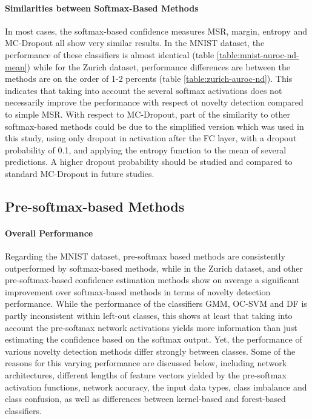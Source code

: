 \documentclass[10pt]{article}
\begin{document}
\paragraph{Similarities between Softmax-Based Methods }  In most cases, the softmax-based confidence measures \gls{MSR}, margin, entropy and \gls{MC-Dropout} all show very similar results. In the MNIST dataset, the performance of these classifiers is almost identical (table \ref{table:mnist-auroc-nd-mean}) while for the Zurich dataset, performance differences are between the methods are on the order of 1-2 percents (table \ref{table:zurich-auroc-nd}). This indicates that taking into account the several softmax activations does not necessarily improve the performance with respect ot novelty detection compared to simple \gls{MSR}. With respect to \gls{MC-Dropout}, part of the similarity to other softmax-based methods could be due to the simplified version which was used in this study, using only dropout in activation after the \gls{FC} layer, with a dropout probability of 0.1, and applying the entropy function to the mean of several predictions. A higher dropout probability should be studied and compared to standard \gls{MC-Dropout} in future studies. 

\subsection{Pre-softmax-based Methods}
\paragraph{Overall Performance}  Regarding the \gls{MNIST} dataset, pre-softmax based methods are consistently outperformed by softmax-based methods, while in the Zurich dataset,  and other pre-softmax-based confidence estimation methods show on average a significant improvement over softmax-based methods in terms of novelty detection performance. While the performance of the classifiers \gls{GMM}, \gls{OC-SVM} and \gls{DF} is partly inconsistent within left-out classes, this shows at least that taking into account the pre-softmax network activations yields more information than just estimating the confidence based on the softmax output. Yet, the performance of various novelty detection methods differ strongly between classes. Some of the reasons for this varying performance are discussed below, including network architectures, different lengths of feature vectors yielded by the pre-softmax activation functions, network accuracy, the input data types, class imbalance and class confusion, as well as differences between kernel-based and forest-based classifiers.
\end{document}
